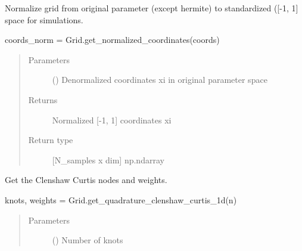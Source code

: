 \documentclass[letterpaper,10pt,english,openany,oneside]{sphinxmanual}
\begin{document}
\begin{fulllineitems}
\begin{fulllineitems}
\end{fulllineitems}


\begin{fulllineitems}
\label{\detokenize{pygpc:pygpc.Grid.Grid.get_normalized_coordinates}}
Normalize grid from original parameter (except hermite) to standardized ({[}-1, 1{]} space for simulations.

coords\_norm = Grid.get\_normalized\_coordinates(coords)
\begin{quote}\begin{description}
\item[{Parameters}] \leavevmode
{} (\sphinxstyleliteralemphasis{\sphinxupquote{{[}}}\sphinxstyleliteralemphasis{\sphinxupquote{{]} }}) \textendash{} Denormalized coordinates xi in original parameter space

\item[{Returns}] \leavevmode
{} \textendash{} Normalized {[}-1, 1{]} coordinates xi

\item[{Return type}] \leavevmode
{[}N\_samples x dim{]} np.ndarray

\end{description}\end{quote}

\end{fulllineitems}


\begin{fulllineitems}
\label{\detokenize{pygpc:pygpc.Grid.Grid.get_quadrature_clenshaw_curtis_1d}}
Get the Clenshaw Curtis nodes and weights.

knots, weights = Grid.get\_quadrature\_clenshaw\_curtis\_1d(n)
\begin{quote}\begin{description}
\item[{Parameters}] \leavevmode
{} () \textendash{} Number of knots


\end{description}
\end{quote}
\end{fulllineitems}
\end{fulllineitems}
\end{document}
